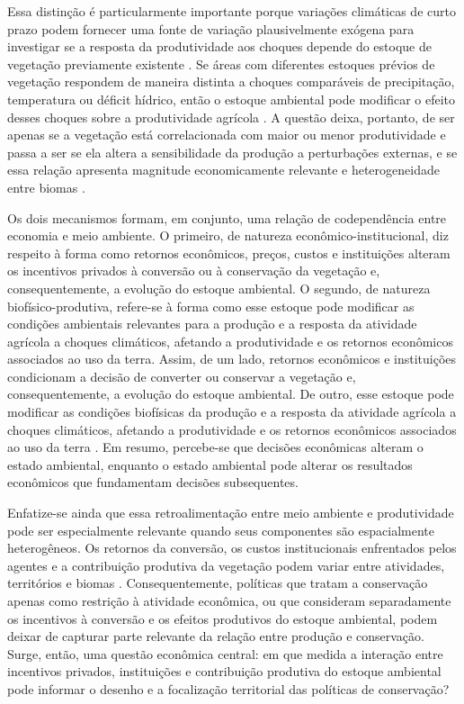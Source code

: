 Essa distinção é particularmente importante porque variações climáticas de curto prazo podem fornecer uma fonte de variação plausivelmente exógena para investigar se a resposta da produtividade aos choques depende do estoque de vegetação previamente existente \cite{DellEtAl2014}. Se áreas com diferentes estoques prévios de vegetação respondem de maneira distinta a choques comparáveis de precipitação, temperatura ou déficit hídrico, então o estoque ambiental pode modificar o efeito desses choques sobre a produtividade agrícola \cite{RedheadEtAl2020}. A questão deixa, portanto, de ser apenas se a vegetação está correlacionada com maior ou menor produtividade e passa a ser se ela altera a sensibilidade da produção a perturbações externas, e se essa relação apresenta magnitude economicamente relevante e heterogeneidade entre biomas \cite{RedheadEtAl2020,XiaoEtAl2023}.

Os dois mecanismos formam, em conjunto, uma relação de codependência entre economia e meio ambiente. O primeiro, de natureza econômico-institucional, diz respeito à forma como retornos econômicos, preços, custos e instituições alteram os incentivos privados à conversão ou à conservação da vegetação e, consequentemente, a evolução do estoque ambiental. O segundo, de natureza biofísico-produtiva, refere-se à forma como esse estoque pode modificar as condições ambientais relevantes para a produção e a resposta da atividade agrícola a choques climáticos, afetando a produtividade e os retornos econômicos associados ao uso da terra. Assim, de um lado, retornos econômicos e instituições condicionam a decisão de converter ou conservar a vegetação e, consequentemente, a evolução do estoque ambiental. De outro, esse estoque pode modificar as condições biofísicas da produção e a resposta da atividade agrícola a choques climáticos, afetando a produtividade e os retornos econômicos associados ao uso da terra \cite{BermanEtAl2023,RedheadEtAl2020}. Em resumo, percebe-se que decisões econômicas alteram o estado ambiental, enquanto o estado ambiental pode alterar os resultados econômicos que fundamentam decisões subsequentes.

Enfatize-se ainda que essa retroalimentação entre meio ambiente e produtividade pode ser especialmente relevante quando seus componentes são espacialmente heterogêneos. Os retornos da conversão, os custos institucionais enfrentados pelos agentes e a contribuição produtiva da vegetação podem variar entre atividades, territórios e biomas \cite{BradfordEtAl2006,UptonEtAl2014}. Consequentemente, políticas que tratam a conservação apenas como restrição à atividade econômica, ou que consideram separadamente os incentivos à conversão e os efeitos produtivos do estoque ambiental, podem deixar de capturar parte relevante da relação entre produção e conservação. Surge, então, uma questão econômica central: em que medida a interação entre incentivos privados, instituições e contribuição produtiva do estoque ambiental pode informar o desenho e a focalização territorial das políticas de conservação?

